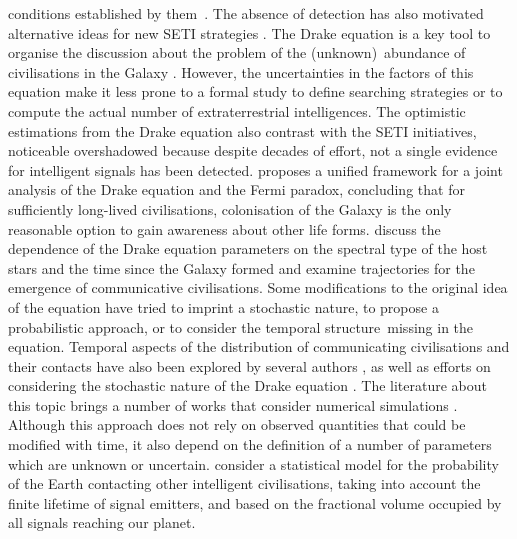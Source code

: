 \documentclass[crop]{CSLB}
\begin{document}
conditions established by them \citep{tarter_search_2001}.
%
The absence of detection has also motivated alternative ideas for new
SETI strategies \citep{forgan_exoplanet_2017, balbi_impact_2018,
loeb_eavesdropping_2006, maccone_KLT_2010, tarter_advancing_2009,
enriquez_breakthrough_2017, loeb_relative_2016, maccone_SETI_2011,
lingam_relative_2019, wright_theGsearch_2015, maccone_SETI_2013,
maccone_lognormals_2014, harp_application_2018,
forgan_possibility_2013, forgan_galactic_2017, funes_searching_2019}.
%
The Drake equation is a key tool to organise the discussion about the
problem of the (unknown) abundance of civilisations in the Galaxy
\citep{hinkel_interdisciplinary_2019}.
%
However, the uncertainties in the factors of this equation make it
less prone to a formal study to define searching strategies or to
compute the actual number of extraterrestrial intelligences.
%
The optimistic estimations from the Drake equation also contrast with
the SETI initiatives, noticeable overshadowed because despite decades
of effort, not a single evidence for intelligent signals has been
detected.
%
\citet{prantzos_joint_2013} proposes a unified framework for a joint
analysis of the Drake equation and the Fermi paradox, concluding that
for sufficiently long-lived civilisations, colonisation of the Galaxy
is the only reasonable option to gain awareness about other life
forms.
%
\citet{haqq-misra_drake_2017} discuss the dependence of the Drake
equation parameters on the spectral type of the host stars and the
time since the Galaxy formed and examine trajectories for the
emergence of communicative civilisations.
%
Some modifications to the original idea of the equation have tried to
imprint a stochastic nature, to propose a probabilistic approach, or
to consider the temporal structure missing in the equation.
%
Temporal aspects of the distribution of communicating civilisations
and their contacts have also been explored by several authors
\citep{fogg_temporal_1987, forgan_spatiotemporal_2011,
balbi_impact_2018, balb_spatiotemporal_2018, horvat_impact_2011}, as
well as efforts on considering the stochastic nature of the Drake
equation \citep{glade_stochastic_2011}.
%
The literature about this topic brings a number of works that consider
numerical simulations \citep{forgan_evaluating_2015,
vukotic_grandeur_2016, murante_simulating_2015, forgan_numerical_2009,
forgan_galactic_2017, ramirez_new_2017}.
%
Although this approach does not rely on observed quantities that could
be modified with time, it also depend on the definition of a number of
parameters which are unknown or uncertain.
%
\citet{grimaldi_signal_2017} consider a statistical model for the
probability of the Earth contacting other intelligent civilisations,
taking into account the finite lifetime of signal emitters, and based
on the fractional volume occupied by all signals reaching our planet.
\end{document}
